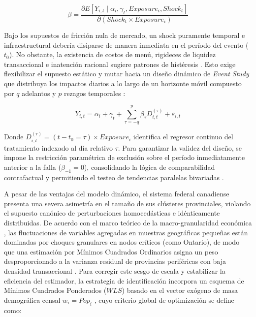 \begin{equation}
    \beta = \frac{\partial \textit{$E$}\left[ Y_{i,t} \mid \alpha_i, \gamma_t, Exposure_i, Shock_t \right]}{\partial \left( Shock_t \times Exposure_i \right)}
\end{equation}

Bajo los supuestos de fricci\'on nula de mercado, un shock puramente temporal e infraestructural deber\'ia disiparse de manera inmediata en el per\'iodo del evento ($t_0$). No obstante, la existencia de costos de men\'u, rigideces de liquidez transaccional e inatenci\'on racional sugiere patrones de hist\'eresis \citep{alvarez2009financial, sims2003implications}. Esto exige flexibilizar el supuesto est\'atico y mutar hacia un dise\~no din\'amico de \textit{Event Study} que distribuya los impactos diarios a lo largo de un horizonte m\'ovil compuesto por $q$ adelantos y $p$ rezagos temporales \citep{schmidheiny2019event}:

\begin{equation}
    Y_{i,t} = \alpha_i + \gamma_t + \sum_{\tau = -q}^{p} \beta_{\tau} D_{i,t}^{(\tau)} + \varepsilon_{i,t}
\end{equation}

Donde $D_{i,t}^{(\tau)} = (t - t_0 = \tau) \times Exposure_i$ identifica el regresor continuo del tratamiento indexado al d\'ia relativo $\tau$. Para garantizar la validez del dise\~no, se impone la restricci\'on param\'etrica de exclusi\'on sobre el per\'iodo inmediatamente anterior a la falla ($\beta_{-1} = 0$), consolidando la l\'ogica de comparabilidad contrafactual y permitiendo el testeo de tendencias paralelas bivariadas \citep{rambachan2023credible, baker2026difference, callaway2021difference}.

A pesar de las ventajas del modelo din\'amico, el sistema federal canadiense presenta una severa asimetr\'ia en el tama\~no de sus cl\'usteres provinciales, violando el supuesto can\'onico de perturbaciones homoced\'asticas e id\'enticamente distribuidas. De acuerdo con el marco te\'orico de la macro-granularidad econ\'omica \citep{gabaix2011granular}, las fluctuaciones de variables agregadas en muestras geogr\'aficas peque\~nas est\'an dominadas por choques granulares en nodos cr\'iticos (como Ontario), de modo que una estimaci\'on por M\'inimos Cuadrados Ordinarios asigna un peso desproporcionado a la varianza residual de provincias perif\'ericas con baja densidad transaccional \citep{moulton1990aggregate}. Para corregir este sesgo de escala y estabilizar la eficiencia del estimador, la estrategia de identificaci\'on incorpora un esquema de M\'inimos Cuadrados Ponderados ($WLS$) basado en el vector ex\'ogeno de masa demogr\'afica censal $w_i = Pop_i$ \citep{statscan2021pop}, cuyo criterio global de optimizaci\'on se define como:

